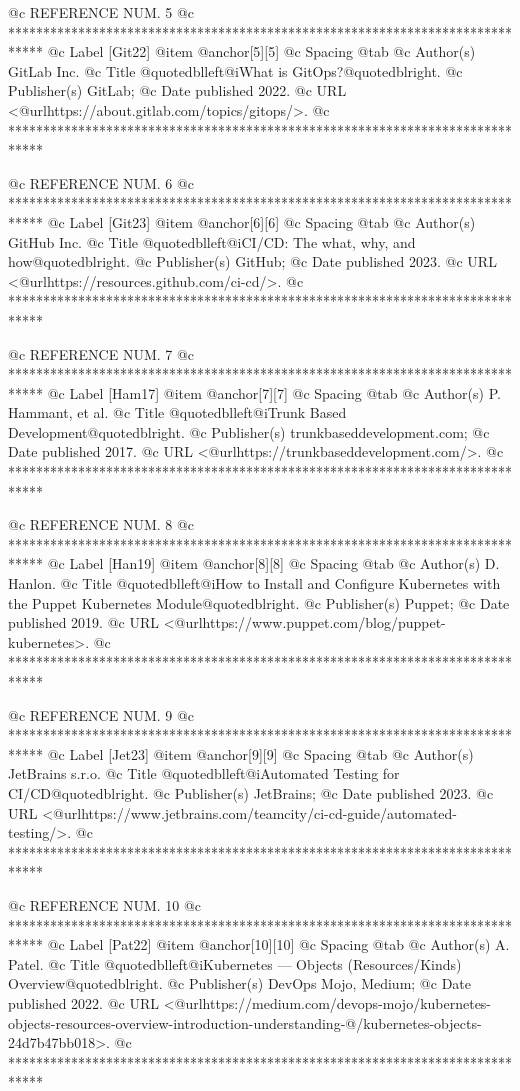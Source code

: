 @c REFERENCE NUM. 5
@c *****************************************************************************
@c Label [Git22]
@item @anchor{[5]}[5]
@c Spacing
@tab
@c Author(s)
GitLab Inc.
@c Title
@quotedblleft{}@i{What is GitOps?}@quotedblright{}.
@c Publisher(s)
GitLab;
@c Date published
2022.
@c URL
<@url{https://about.gitlab.com/topics/gitops/}>.
@c *****************************************************************************

@c REFERENCE NUM. 6
@c *****************************************************************************
@c Label [Git23]
@item @anchor{[6]}[6]
@c Spacing
@tab
@c Author(s)
GitHub Inc.
@c Title
@quotedblleft{}@i{CI/CD: The what, why, and how}@quotedblright{}.
@c Publisher(s)
GitHub;
@c Date published
2023.
@c URL
<@url{https://resources.github.com/ci-cd/}>.
@c *****************************************************************************

@c REFERENCE NUM. 7
@c *****************************************************************************
@c Label [Ham17]
@item @anchor{[7]}[7]
@c Spacing
@tab
@c Author(s)
P. Hammant, et al.
@c Title
@quotedblleft{}@i{Trunk Based Development}@quotedblright{}.
@c Publisher(s)
trunkbaseddevelopment.com;
@c Date published
2017.
@c URL
<@url{https://trunkbaseddevelopment.com/}>.
@c *****************************************************************************

@c REFERENCE NUM. 8
@c *****************************************************************************
@c Label [Han19]
@item @anchor{[8]}[8]
@c Spacing
@tab
@c Author(s)
D. Hanlon.
@c Title
@quotedblleft{}@i{How to Install and Configure Kubernetes with the Puppet Kubernetes Module}@quotedblright{}.
@c Publisher(s)
Puppet;
@c Date published
2019.
@c URL
<@url{https://www.puppet.com/blog/puppet-kubernetes}>.
@c *****************************************************************************

@c REFERENCE NUM. 9
@c *****************************************************************************
@c Label [Jet23]
@item @anchor{[9]}[9]
@c Spacing
@tab
@c Author(s)
JetBrains s.r.o.
@c Title
@quotedblleft{}@i{Automated Testing for CI/CD}@quotedblright{}.
@c Publisher(s)
JetBrains;
@c Date published
2023.
@c URL
<@url{https://www.jetbrains.com/teamcity/ci-cd-guide/automated-testing/}>.
@c *****************************************************************************

@c REFERENCE NUM. 10
@c *****************************************************************************
@c Label [Pat22]
@item @anchor{[10]}[10]
@c Spacing
@tab
@c Author(s)
A. Patel.
@c Title
@quotedblleft{}@i{Kubernetes — Objects (Resources/Kinds) Overview}@quotedblright{}.
@c Publisher(s)
DevOps Mojo, Medium;
@c Date published
2022.
@c URL
<@url{https://medium.com/devops-mojo/kubernetes-objects-resources-overview-introduction-understanding-@/kubernetes-objects-24d7b47bb018}>.
@c *****************************************************************************

